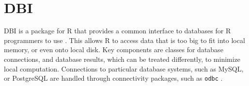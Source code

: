 \section{DBI}

DBI is a package for R that provides a common interface to databases for R
programmers to use \cite{hid-sp18-403-R-r-dbi-dbi}. This allows R to access
data that is too big to fit into local memory, or even onto local disk. Key
components are classes for database connections, and database results, which
can be treated differently, to minimize local computation. Connections to
particular database systems, such as MySQL, or PostgreSQL are handled through
connectivity packages, such as \texttt{odbc}
\cite{hid-sp18-403-www-r-studio-odbc}.
